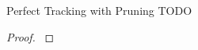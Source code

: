 \begin{theorem}{Perfect Tracking with Pruning TODO}
\label{thm:perfect-tracking-todo}

\end{theorem}

\begin{proof}
\label{prf:perfect-tracking-todo}

\end{proof}
